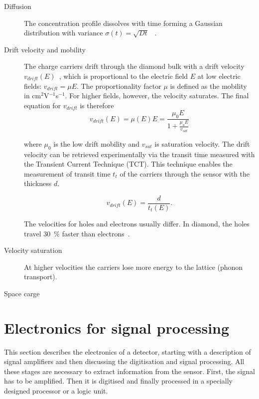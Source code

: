 \documentclass[12pt]{mytustyle}  %
\begin{document}
\begin{description}

\item[Diffusion]
The concentration profile dissolves with time forming a Gaussian distribution with variance $\sigma(t)=\sqrt{Dt}$~\cite{} .

\item[Drift velocity and mobility]
The charge carriers drift through the diamond bulk with a drift velocity $v_{drift}(E)$~\cite{}, which is proportional to the electric field $E$ at low electric fields: $v_{drift} = \mu E$. The proportionality factor $\mu$ is defined as the mobility in cm$^2$V$^{-1}$s$^{-1}$. For higher fields, however, the velocity saturates. The final equation for $v_{drift}$ is therefore
\begin{equation}
\label{eq:vsat}
v_{drift}(E) = \mu(E)E= \frac{\mu_0 E}{1 + \frac{\mu_o E}{v_{sat}}}
\end{equation}

where $\mu_0$ is the low drift mobility and $v_{sat}$ is saturation velocity. The drift velocity can be retrieved experimentally via the transit time measured with the Transient Current Technique (TCT). This technique enables the measurement of transit time $t_t$ of the carriers through the sensor with the thickness $d$. 

\begin{equation}
\label{eq:vsat}
v_{drift}(E) = \frac{d}{t_t(E)}.
\end{equation}

The velocities for holes and electrons usually differ. In diamond, the holes travel 30~\% faster than electrons~\cite{}.

\item[Velocity saturation]
At higher velocities the carriers lose more energy to the lattice (phonon transport).

\item[Space carge]


\end{description}













\clearpage
\section{Electronics for signal processing} %
\label{sec:elecsigproc}
This section describes the electronics of a detector, starting with a description of signal amplifiers and then discussing the digitisation and signal processing. All these stages are necessary to extract information from the sensor. First, the signal has to be amplified. Then it is digitised and finally processed in a specially designed processor or a logic unit.
\end{document}
